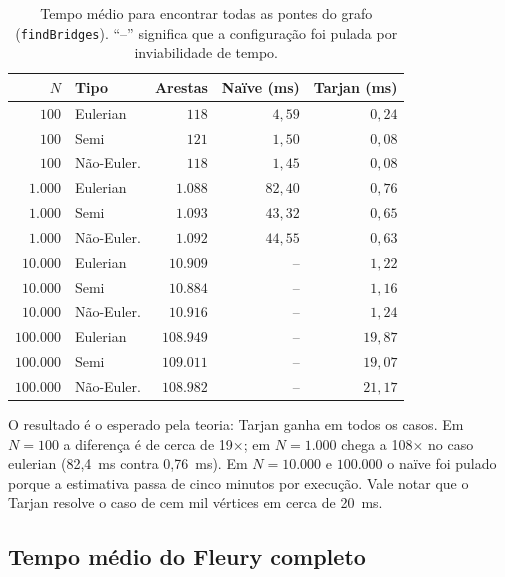 \documentclass[a4paper,11pt]{article}
\begin{document}
\begin{table}[h]
\centering
\caption{Tempo médio para encontrar todas as pontes do grafo (\texttt{findBridges}). ``--'' significa que a configuração foi pulada por inviabilidade de tempo.}
\label{tab:bridges}
\begin{tabular}{rlrrr}
\toprule
$N$ & Tipo & Arestas & Naïve (ms) & Tarjan (ms) \\
\midrule
$100$       & Eulerian      & $118$    & $4{,}59$    & $0{,}24$ \\
$100$       & Semi          & $121$    & $1{,}50$    & $0{,}08$ \\
$100$       & Não-Euler.    & $118$    & $1{,}45$    & $0{,}08$ \\
\midrule
$1.000$     & Eulerian      & $1.088$  & $82{,}40$   & $0{,}76$ \\
$1.000$     & Semi          & $1.093$  & $43{,}32$   & $0{,}65$ \\
$1.000$     & Não-Euler.    & $1.092$  & $44{,}55$   & $0{,}63$ \\
\midrule
$10.000$    & Eulerian      & $10.909$ & --          & $1{,}22$ \\
$10.000$    & Semi          & $10.884$ & --          & $1{,}16$ \\
$10.000$    & Não-Euler.    & $10.916$ & --          & $1{,}24$ \\
\midrule
$100.000$   & Eulerian      & $108.949$ & --         & $19{,}87$ \\
$100.000$   & Semi          & $109.011$ & --         & $19{,}07$ \\
$100.000$   & Não-Euler.    & $108.982$ & --         & $21{,}17$ \\
\bottomrule
\end{tabular}
\end{table}

O resultado é o esperado pela teoria: Tarjan ganha em todos os casos. Em $N=100$ a diferença é de cerca de 19$\times$; em $N=1.000$ chega a 108$\times$ no caso eulerian (82{,}4~ms contra 0{,}76~ms). Em $N=10.000$ e $100.000$ o naïve foi pulado porque a estimativa passa de cinco minutos por execução. Vale notar que o Tarjan resolve o caso de cem mil vértices em cerca de 20~ms.

\subsection{Tempo médio do Fleury completo}
\end{document}
